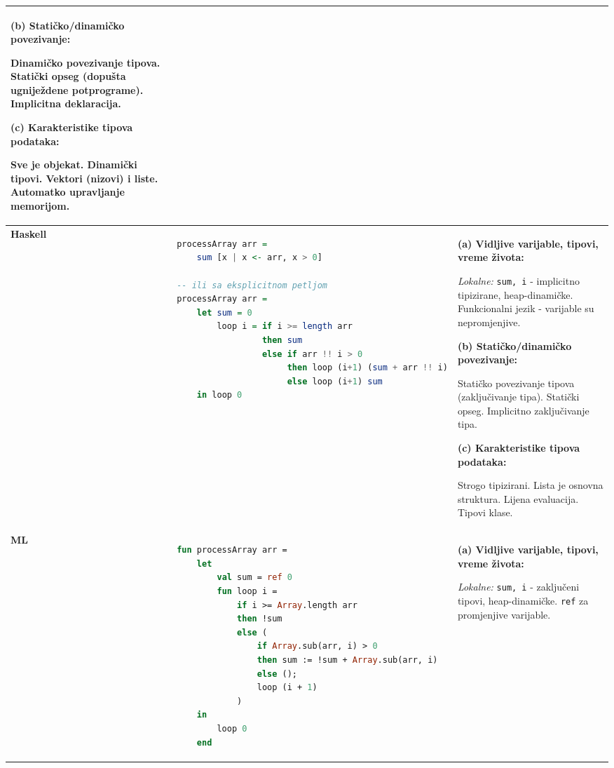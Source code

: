 \documentclass[12pt,a4paper]{article}
\begin{document}
\begin{longtable}{|p{2cm}|p{5cm}|p{8cm}|}
\vspace{0.2cm}
\textbf{(b) Statičko/dinamičko povezivanje:}

Dinamičko povezivanje tipova. Statički opseg (dopušta ugniježdene potprograme). Implicitna deklaracija.

\vspace{0.2cm}
\textbf{(c) Karakteristike tipova podataka:}

Sve je objekat. Dinamički tipovi. Vektori (nizovi) i liste. Automatko upravljanje memorijom. \\
\hline

\textbf{Haskell} & 
\begin{lstlisting}[language=Haskell]
processArray arr = 
    sum [x | x <- arr, x > 0]
    
-- ili sa eksplicitnom petljom
processArray arr = 
    let sum = 0
        loop i = if i >= length arr
                 then sum
                 else if arr !! i > 0
                      then loop (i+1) (sum + arr !! i)
                      else loop (i+1) sum
    in loop 0
\end{lstlisting} & 
\textbf{(a) Vidljive varijable, tipovi, vreme života:}

\textit{Lokalne:} \texttt{sum, i} - implicitno tipizirane, heap-dinamičke. Funkcionalni jezik - varijable su nepromjenjive.

\vspace{0.2cm}
\textbf{(b) Statičko/dinamičko povezivanje:}

Statičko povezivanje tipova (zaključivanje tipa). Statički opseg. Implicitno zaključivanje tipa.

\vspace{0.2cm}
\textbf{(c) Karakteristike tipova podataka:}

Strogo tipizirani. Lista je osnovna struktura. Lijena evaluacija. Tipovi klase. \\
\hline

\textbf{ML} & 
\begin{lstlisting}[language=ML]
fun processArray arr =
    let
        val sum = ref 0
        fun loop i =
            if i >= Array.length arr
            then !sum
            else (
                if Array.sub(arr, i) > 0
                then sum := !sum + Array.sub(arr, i)
                else ();
                loop (i + 1)
            )
    in
        loop 0
    end
\end{lstlisting} & 
\textbf{(a) Vidljive varijable, tipovi, vreme života:}

\textit{Lokalne:} \texttt{sum, i} - zaključeni tipovi, heap-dinamičke. \texttt{ref} za promjenjive varijable.


\end{longtable}
\end{document}
